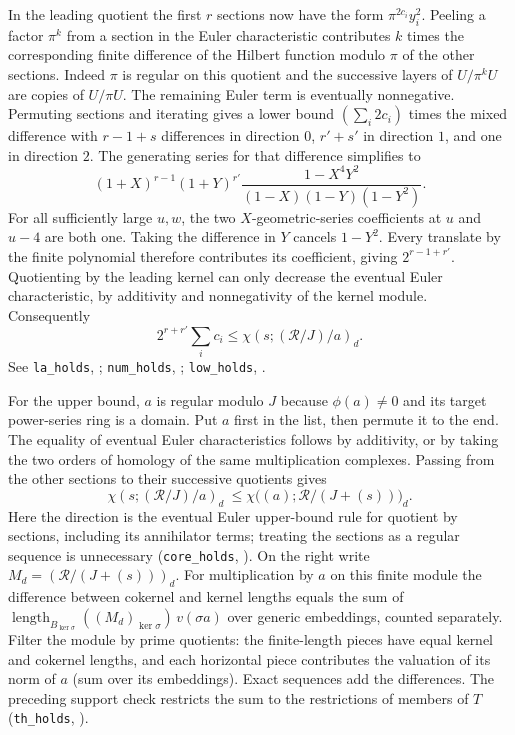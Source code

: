 In the leading quotient the first $r$ sections now have the form
$\pi^{2c_i}y_i^2$. Peeling a factor $\pi^k$ from a section in the
Euler characteristic contributes $k$ times the corresponding
finite difference of the Hilbert function modulo $\pi$ of the
other sections. Indeed $\pi$ is regular on this quotient and the
successive layers of $U/\pi^k U$ are copies of $U/\pi U$.
The remaining Euler term is eventually nonnegative. Permuting
sections and iterating gives a lower bound
$(\sum_i2c_i)$ times the mixed difference with $r-1+s$ differences
in direction $0$, $r'+s'$ in direction $1$, and one in direction $2$.
The generating series for that difference simplifies to
\[
 (1+X)^{r-1}(1+Y)^{r'}
 \frac{1-X^4Y^2}{(1-X)(1-Y)(1-Y^2)} .
\]
For all sufficiently large $u,w$, the two $X$-geometric-series
coefficients at $u$ and $u-4$ are both one. Taking the difference in
$Y$ cancels $1-Y^2$. Every translate by the finite polynomial
therefore contributes its coefficient, giving $2^{r-1+r'}$.
Quotienting by the leading kernel can only decrease the eventual
Euler characteristic, by additivity and nonnegativity of the
kernel module. Consequently
\[
 2^{r+r'}\sum_i c_i
       \le \chi(s; (\mathcal R/J)/a)_d .
\]
See \nolinkurl{la_holds}, ;
\nolinkurl{num_holds}, ;
\nolinkurl{low_holds}, .

For the upper bound, $a$ is regular modulo $J$ because $\phi(a)\ne0$
and its target power-series ring is a domain. Put $a$ first in the
list, then permute it to the end. The equality of eventual Euler
characteristics follows by additivity, or by taking the two orders
of homology of the same multiplication complexes. Passing from
the other sections to their successive quotients gives
\[
 \chi(s;(\mathcal R/J)/a)_d\ \le \chi\bigl((a);\mathcal R/(J+(s))\bigr)_d .
\]
Here the direction is the eventual Euler upper-bound rule for
quotient by sections, including its annihilator terms; treating the
sections as a regular sequence is unnecessary
(\nolinkurl{core_holds}, ).
On the right write $M_d=(\mathcal R/(J+(s)))_d$. For multiplication
by $a$ on this finite module the difference between cokernel and
kernel lengths equals the sum of
$\operatorname{length}_{B_{\ker\sigma}}\!\left((M_d)_{\ker\sigma}\right)\,v(\sigma a)$
over generic embeddings, counted separately. Filter the module by
prime quotients: the finite-length pieces have equal kernel and
cokernel lengths, and each horizontal piece contributes the
valuation of its norm of $a$ (sum over its embeddings). Exact
sequences add the differences. The preceding support check restricts
the sum to the restrictions of members of $T$
(\nolinkurl{th_holds}, ).

